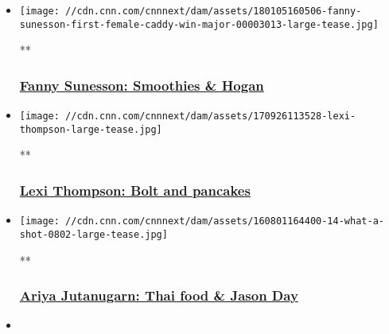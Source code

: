 \begin{itemize}
\item
  \href{/videos/sports/2018/01/29/fanny-sunesson-perfect-day-nick-faldo-ben-hogan-living-golf-orig.cnn}{}

  \texttt{[image: //cdn.cnn.com/cnnnext/dam/assets/180105160506-fanny-sunesson-first-female-caddy-win-major-00003013-large-tease.jpg]}

  **

  \hypertarget{fanny-sunesson-smoothies--hogan}{%
  \subsubsection{\texorpdfstring{\href{/videos/sports/2018/01/29/fanny-sunesson-perfect-day-nick-faldo-ben-hogan-living-golf-orig.cnn}{Fanny
  Sunesson: Smoothies \&
  Hogan}}{Fanny Sunesson: Smoothies \& Hogan}}\label{fanny-sunesson-smoothies--hogan}}
\item
  \href{/videos/sports/2017/10/02/lexi-thompson-perfect-day-augusta-pancakes-usain-bolt-justin-timberlake-living-golf-orig.cnn}{}

  \texttt{[image: //cdn.cnn.com/cnnnext/dam/assets/170926113528-lexi-thompson-large-tease.jpg]}

  **

  \hypertarget{lexi-thompson-bolt-and-pancakes}{%
  \subsubsection{\texorpdfstring{\href{/videos/sports/2017/10/02/lexi-thompson-perfect-day-augusta-pancakes-usain-bolt-justin-timberlake-living-golf-orig.cnn}{Lexi
  Thompson: Bolt and
  pancakes}}{Lexi Thompson: Bolt and pancakes}}\label{lexi-thompson-bolt-and-pancakes}}
\item
  \href{/videos/sports/2017/07/05/ariya-jutanugarn-perfect-day-jason-day-oakmont-thai-food-living-golf-orig.cnn}{}

  \texttt{[image: //cdn.cnn.com/cnnnext/dam/assets/160801164400-14-what-a-shot-0802-large-tease.jpg]}

  **

  \hypertarget{ariya-jutanugarn-thai-food--jason-day}{%
  \subsubsection{\texorpdfstring{\href{/videos/sports/2017/07/05/ariya-jutanugarn-perfect-day-jason-day-oakmont-thai-food-living-golf-orig.cnn}{Ariya
  Jutanugarn: Thai food \& Jason
  Day}}{Ariya Jutanugarn: Thai food \& Jason Day}}\label{ariya-jutanugarn-thai-food--jason-day}}
\item
  \href{/videos/sports/2018/02/06/thomas-bjorn-perfect-day-tiger-woods-gin-tonic-guns-n-roses-living-golf-orig.cnn}{}


\end{itemize}

